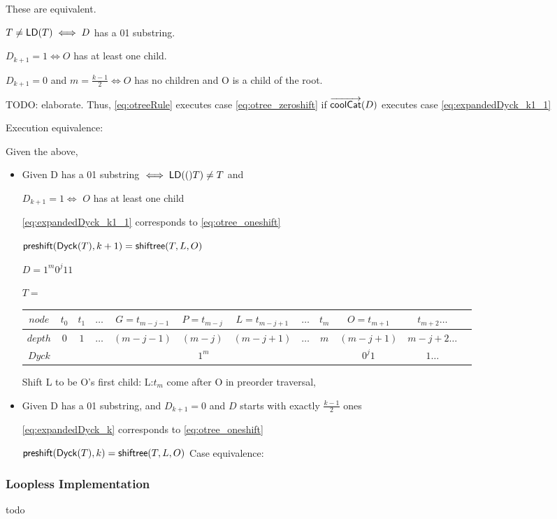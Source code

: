 \begin{enumerate}
\begin{itemize}
	\end{itemize}

	These are equivalent. 

	$T \ne \mathsf{LD}{(T)} \iff D$ has a 01 substring.

	$D_{k+1}=1 \iff O$ has at least one child.

	$D_{k+1}=0$ and $m=\frac{k-1}{2} \iff O$ has no children and O is a child of the root.

	TODO: elaborate. Thus, \ref{eq:otreeRule} executes case \ref{eq:otree_zeroshift} if  $\overrightarrow{\mathsf{coolCat}}{(D)}$ executes case \ref{eq:expandedDyck_k1_1}

	Execution equivalence: 

	Given the above,

	\begin{itemize}
	    \item Given D has a 01 substring $\iff \mathsf{LD}{(()}T) \ne T$ and 

		$D_{k+1}=1 \iff$ $O$ has at least one child
\bigskip

		\ref{eq:expandedDyck_k1_1} corresponds to  \ref{eq:otree_oneshift}

	    $\mathsf{preshift(} \mathsf{Dyck}{(T)}, k+1 \mathsf{)}=\mathsf{shiftree(} T, L, O \mathsf{)}$

		$D=1^m0^j11$


		$T=$
		\begin{center}
		\begin{tabular}{ |c|c|c|c|c|c|c|c|c|c|c|c| } 
		 \hline

		    $node$ & $t_0$ & $t_1$ & $\dots$ & $G=t_{m-j-1}$ & $P=t_{m-j}$ & $L=t_{m-j+1}$ & $\dots$ & $t_m$ & $O=t_{m+1}$ & $t_{m+2}\dots$ \\
		 \hline
		    $depth$ & $0$ & $1$ & $\dots$ & $(m-j-1)$ & $(m-j)$ & $(m-j+1)$ & $\dots$ & $m$  & $(m-j+1)$ & $m-j+2 \dots$\\
		 \hline
		    $Dyck$ &  &  \multicolumn{7}{|c|}{$1^m$} &  $0^{j}1$   & $1\dots$\\
		 \hline
		\end{tabular}
		\end{center}

		Shift L to be O's first child: L:$t_m$ come after O in preorder traversal, 
	\item Given D has a 01 substring, and $D_{k+1}=0$ and $D$ starts with exactly $\frac{k-1}{2}$ ones 

	    \ref{eq:expandedDyck_k} corresponds to  \ref{eq:otree_oneshift}

	    $\mathsf{preshift(} \mathsf{Dyck}{(T)}, k \mathsf{)}=\mathsf{shiftree(} T, L, O \mathsf{)}$
	    Case equivalence: 


     \end{itemize}
\end{enumerate}



\subsubsection{Loopless Implementation}
todo
